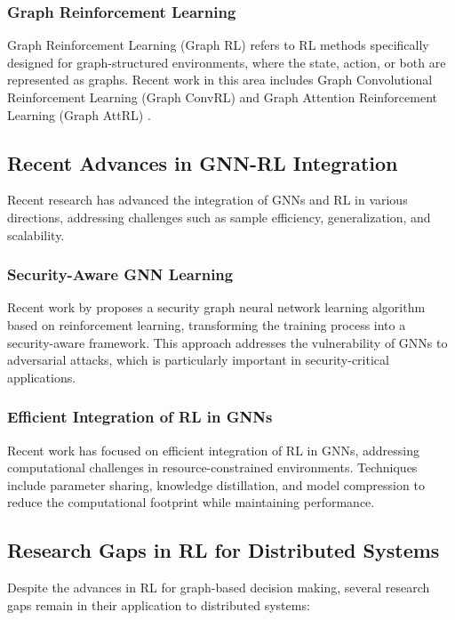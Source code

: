 \documentclass{article}
\begin{document}
\subsubsection{Graph Reinforcement Learning}

Graph Reinforcement Learning (Graph RL) refers to RL methods specifically designed for graph-structured environments, where the state, action, or both are represented as graphs. Recent work in this area includes Graph Convolutional Reinforcement Learning (Graph ConvRL) \cite{jiang2018graph} and Graph Attention Reinforcement Learning (Graph AttRL) \cite{lee2019attention}.

\subsection{Recent Advances in GNN-RL Integration}

Recent research has advanced the integration of GNNs and RL in various directions, addressing challenges such as sample efficiency, generalization, and scalability.

\subsubsection{Security-Aware GNN Learning}

Recent work by \cite{rl2025security} proposes a security graph neural network learning algorithm based on reinforcement learning, transforming the training process into a security-aware framework. This approach addresses the vulnerability of GNNs to adversarial attacks, which is particularly important in security-critical applications.

\subsubsection{Efficient Integration of RL in GNNs}

Recent work has focused on efficient integration of RL in GNNs, addressing computational challenges in resource-constrained environments. Techniques include parameter sharing, knowledge distillation, and model compression to reduce the computational footprint while maintaining performance.

\subsection{Research Gaps in RL for Distributed Systems}

Despite the advances in RL for graph-based decision making, several research gaps remain in their application to distributed systems:
\end{document}
